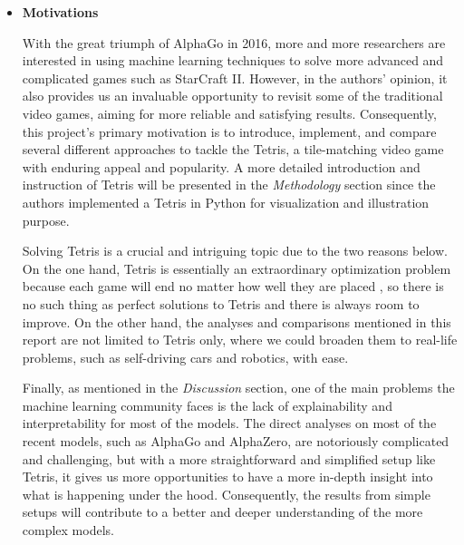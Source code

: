 \documentclass[letterpaper]{article} %
\begin{document}
%
\begin{itemize} 

\item 
{\bf Motivations}


With the great triumph of AlphaGo in 2016, more and more researchers are interested in using machine learning techniques to solve more advanced and complicated games such as StarCraft II. However, in the authors' opinion, it also provides us an invaluable opportunity to revisit some of the traditional video games, aiming for more reliable and satisfying results. Consequently, this project's primary motivation is to introduce, implement, and compare several different approaches to tackle the Tetris, a tile-matching video game with enduring appeal and popularity. A more detailed introduction and instruction of Tetris will be presented in the {\it Methodology} section since the authors implemented a Tetris in Python for visualization and illustration purpose.

Solving Tetris is a crucial and intriguing topic due to the two reasons below. On the one hand, Tetris is essentially an extraordinary optimization problem because each game will end no matter how well they are placed \cite{burgiel_1997}, so there is no such thing as perfect solutions to Tetris and there is always room to improve. On the other hand, the analyses and comparisons mentioned in this report are not limited to Tetris only, where we could broaden them to real-life problems, such as self-driving cars and robotics, with ease.

Finally, as mentioned in the {\it Discussion} section, one of the main problems the machine learning community faces is the lack of explainability and interpretability for most of the models. The direct analyses on most of the recent models, such as AlphaGo and AlphaZero, are notoriously complicated and challenging, but with a more straightforward and simplified setup like Tetris, it gives us more opportunities to have a more in-depth insight into what is happening under the hood. Consequently, the results from simple setups will contribute to a better and deeper understanding of the more complex models.


\end{itemize}
\end{document}
